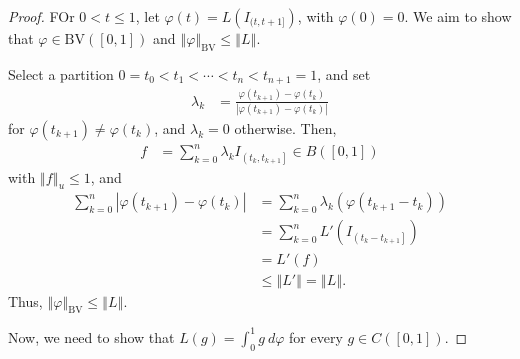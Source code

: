\documentclass[10pt]{extarticle}
\newcommand{\norm}[1]{\left\Vert #1\right\Vert}
\theoremstyle{plain}
\theoremstyle{definition}
\theoremstyle{note}
\renewcommand{\newline}{\hfill\break}
\begin{document}
\begin{proof}
  FOr $0 < t \leq 1$, let $\varphi(t) = L\left(I_{(t,t+1]}\right)$, with $\varphi(0) = 0$. We aim to show that $\varphi \in \text{BV}\left([0,1]\right)$ and $\norm{\varphi}_{\text{BV}} \leq \norm{L}$.\newline

  Select a partition $0 = t_0 < t_1 < \cdots < t_n < t_{n+1} = 1$, and set
  \begin{align*}
    \lambda_k &= \frac{\varphi\left(t_{k+1}\right) - \varphi\left(t_{k}\right)}{\left\vert \varphi\left(t_{k+1}\right) - \varphi\left(t_k\right) \right\vert}
  \end{align*}
  for $\varphi\left(t_{k+1}\right) \neq \varphi\left(t_k\right)$, and $\lambda_k = 0$ otherwise. Then,
  \begin{align*}
    f &= \sum_{k=0}^{n}\lambda_k I_{\left(t_{k},t_{k+1}\right]} \in B\left([0,1]\right)
  \end{align*}
  with $\norm{f}_{u} \leq 1$, and
  \begin{align*}
    \sum_{k=0}^{n}\left\vert \varphi\left(t_{k+1}\right) - \varphi\left(t_{k}\right) \right\vert &= \sum_{k=0}^{n}\lambda_k\left(\varphi\left(t_{k+1} - t_k\right)\right)\\
       &= \sum_{k=0}^{n}L'\left(I_{\left(t_k - t_{k+1}\right]}\right)\\
           &= L'(f)\\
                             &\leq \norm{L'} = \norm{L}.
  \end{align*}
  Thus, $\norm{\varphi}_{\text{BV}} \leq \norm{L}$.\newline

  Now, we need to show that $L(g) = \int_{0}^{1} g\:d\varphi$ for every $g\in C\left([0,1]\right)$.\newline


\end{proof}
\end{document}
